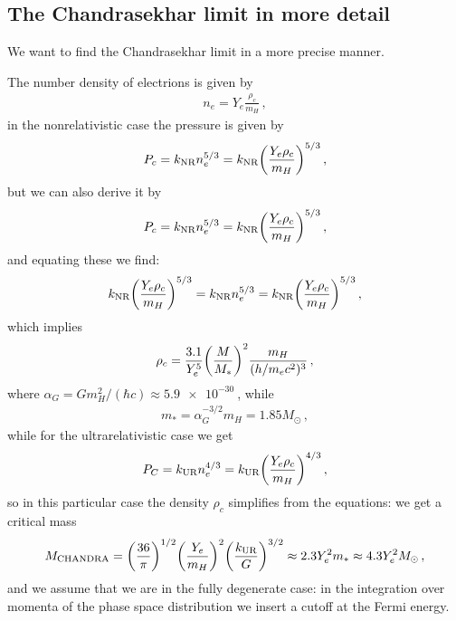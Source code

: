 \documentclass[main.tex]{subfiles}
\begin{document}


\subsection{The Chandrasekhar limit in more detail}

We want to find the Chandrasekhar limit in a more precise manner. 

The number density of electrions is given by 
%
\begin{align}
n_e = Y_{e} \frac{\rho_c}{m_H}
\,,
\end{align}
%
in the nonrelativistic case the pressure is given by 
%
\begin{align}
P_c = k _{\text{NR}} n_e^{5/3} = k _{\text{NR}} \qty(\frac{Y_e \rho_{c}}{m_H})^{5/3}
\,,
\end{align}
%
but we can also derive it by 
%
\begin{align}
P_c = k _{\text{NR}} n_e^{5/3} = k _{\text{NR}} \qty(\frac{Y_e \rho_{c}}{m_H})^{5/3}
\,,
\end{align}
%
and equating these we find: 
%
\begin{align}
 k _{\text{NR}} \qty(\frac{Y_e \rho_{c}}{m_H})^{5/3}
 = k _{\text{NR}} n_e^{5/3} = k _{\text{NR}} \qty(\frac{Y_e \rho_{c}}{m_H})^{5/3}
\,,
\end{align}
%
which implies 
%
\begin{align}
\rho_{c} = \frac{3.1}{Y_e^{5}} \qty(\frac{M}{M_{*}})^2 \frac{m_H}{(h / m_e c^2)^3}
\,,
\end{align}
%
where \(\alpha_{G} = G m_H^2 / (\hbar c) \approx \SI{5.9e-30}{}\), while 
%
\begin{align}
m_{*} = \alpha_{G}^{-3 /2 } m_H = 1.85 M_{\odot}
\,,
\end{align}
%
while for the ultrarelativistic case we get 
%
\begin{align}
P_C = k _{\text{UR}} n_e^{4/3} = k _{\text{UR}} \qty(\frac{Y_e \rho_{c} }{m_H})^{4/3}
\,,
\end{align}
%
so in this particular case the density \(\rho_{c}\) simplifies from the equations: we get a critical mass 
%
\begin{align}
M _{\text{CHANDRA}} = \qty(\frac{36}{\pi })^{1/2} 
\qty(\frac{Y_e}{m_H})^2
\qty(\frac{k _{\text{UR}}}{G})^{3/2} \approx 
2.3 Y_e^2 m_{*} \approx 4.3 Y_e^2 M_{\odot}
\,,
\end{align}
%
and we assume that we are in the fully degenerate case: in the integration over momenta of the phase space distribution we insert a cutoff at the Fermi energy.
\end{document}
